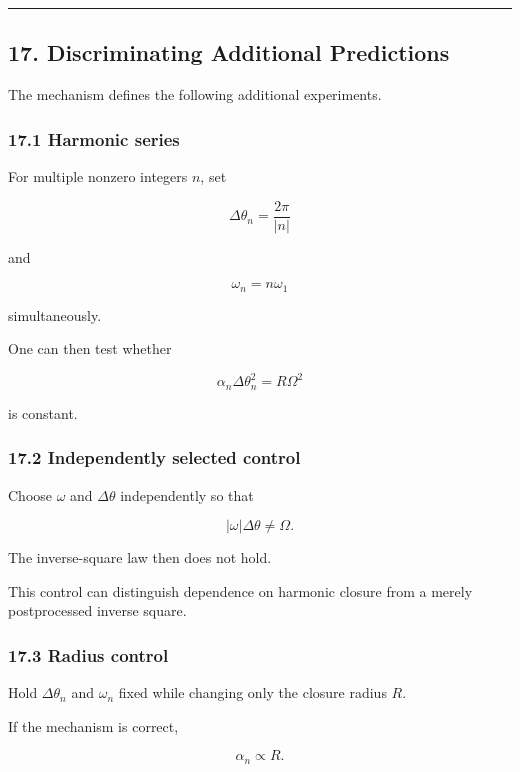 \documentclass[
  a4paper,
]{article}
\begin{document}
\begin{center}\rule{0.5\linewidth}{0.5pt}\end{center}

\subsection{17. Discriminating Additional
Predictions}\label{discriminating-additional-predictions}

The mechanism defines the following additional experiments.

\subsubsection{17.1 Harmonic series}\label{harmonic-series}

For multiple nonzero integers \(n\), set

\[
\Delta\theta_n=\frac{2\pi}{|n|}
\]

and

\[
\omega_n=n\omega_1
\]

simultaneously.

One can then test whether

\[
\alpha_n\Delta\theta_n^2
=R\Omega^2
\]

is constant.

\subsubsection{17.2 Independently selected
control}\label{independently-selected-control}

Choose \(\omega\) and \(\Delta\theta\) independently so that

\[
|\omega|\Delta\theta\neq\Omega.
\]

The inverse-square law then does not hold.

This control can distinguish dependence on harmonic closure from a
merely postprocessed inverse square.

\subsubsection{17.3 Radius control}\label{radius-control}

Hold \(\Delta\theta_n\) and \(\omega_n\) fixed while changing only the
closure radius \(R\).

If the mechanism is correct,

\[
\alpha_n\propto R.
\]
\end{document}
